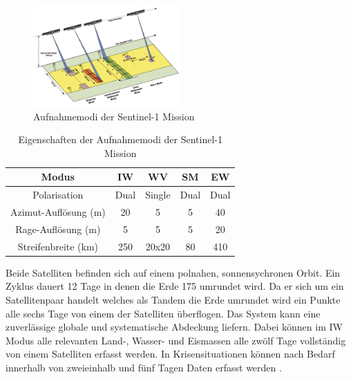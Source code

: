\begin{figure}[H]
    \centering
    \includegraphics[width=0.5\textwidth]{Bilder/Aquisition_Modes.png}
    \caption{Aufnahmemodi der Sentinel-1 Mission \cite{sentinel_1_overview}}
    \label{fig:aquisition_modes}
\end{figure}

\begin{center}
\begin{table}[H]
    \caption{Eigenschaften der Aufnahmemodi der Sentinel-1 Mission \cite{sentinel_1_overview}}
    \centering
    \begin{tabular}{|c|c|c|c|c|} 
        Modus & IW & WV & SM & EW \\ 
        \hline
        Polarisation & Dual & Single & Dual & Dual \\ 
        Azimut-Auflösung (m) & 20 & 5 & 5 & 40 \\
        Rage-Auflösung (m) & 5 & 5 & 5 & 20 \\
        Streifenbreite (km) & 250 & 20x20 & 80 & 410\\
    \end{tabular}
    \label{table:1}
\end{table}
\end{center}

Beide Satelliten befinden sich auf einem polnahen, sonnensychronen Orbit. Ein Zyklus dauert 12 Tage in denen die Erde 175 umrundet wird. Da er sich um ein Satellitenpaar
handelt welches als Tandem die Erde umrundet wird ein Punkte alle sechs Tage von einem der Satelliten überflogen. Das System kann eine zuverlässige globale und systematische
Abdeckung liefern. Dabei können im IW Modus alle relevanten Land-, Wasser- und Eismassen alle zwölf Tage vollständig von einem Satelliten erfasst werden. 
In Krisensituationen können nach Bedarf innerhalb von zweieinhalb und fünf Tagen Daten erfasst werden \cite{sentinel_1_overview}. 

